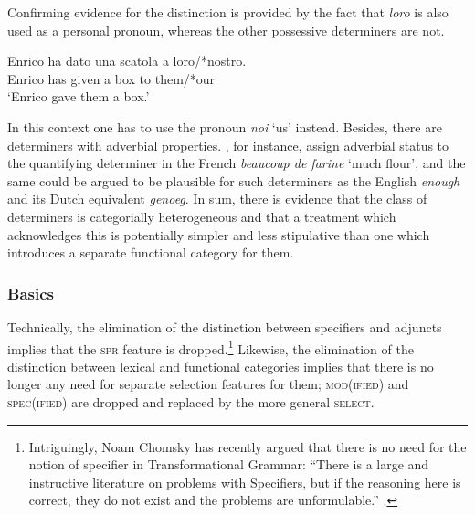 \documentclass[output=paper
                ,modfonts
                ,nonflat
	        ,collection
	        ,collectionchapter
	        ,collectiontoclongg
 	        ,biblatex
                ,babelshorthands
                ,newtxmath
                ,draftmode
                ,colorlinks, citecolor=brown
]{./langsci/langscibook}
\begin{document}
\noindent
Confirming evidence for the distinction is provided by the fact that 
\emph{loro} is also used as a personal pronoun, whereas the other 
possessive determiners are not. 

\begin{exe} 
\ex 
\gll   Enrico ha dato una scatola a loro/*nostro. \\
       Enrico has given a box to them/*our \\
\trans `Enrico gave them a box.'
\end{exe} 

\noindent
In this context one has to use the pronoun \emph{noi} `us' instead. 
Besides, there are determiners with adverbial properties. 
\citet{Abeilleetal04}, for instance, 
assign adverbial status to the quantifying determiner in the French 
\emph{beaucoup de farine} `much flour', and the same could be argued to 
be plausible for such determiners as the English \emph{enough} and its 
Dutch equivalent \emph{genoeg}. 
In sum, there is evidence that the class of determiners is categorially 
heterogeneous and that a treatment which acknowledges this is potentially 
simpler and less stipulative than one which introduces a separate functional 
category for them. 
 

\subsubsection{Basics} 
\label{sec-basics}



Technically, the elimination of the distinction between specifiers and adjuncts
implies that the \textsc{spr} feature is dropped.\footnote{Intriguingly, Noam
Chomsky has recently argued that there is no need for the notion of specifier in 
Transformational Grammar: ``There is a large and instructive literature 
on problems with Specifiers, but if the reasoning here is correct, they do not
exist and the problems are unformulable.'' \citet[43]{Chomsky13}.}  
Likewise, the elimination of the distinction between lexical and 
functional categories implies that there is no longer any need 
for separate selection features for them; \textsc{mod(ified)} and \textsc{spec(ified)}
are dropped and replaced by the more general \textsc{select}.  
\end{document}
